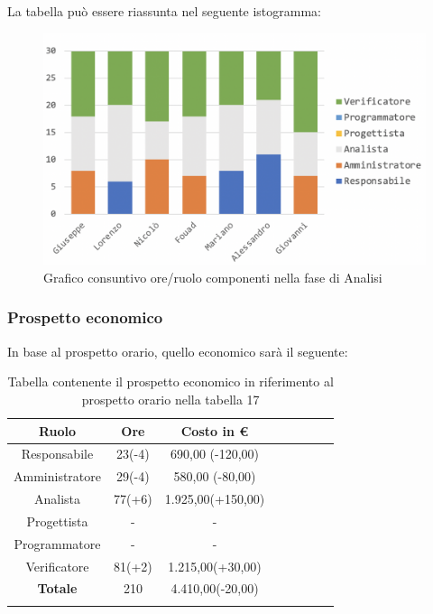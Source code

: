 			La tabella può essere riassunta nel seguente istogramma:
			
			\begin{figure}[H]
				\centering
				\includegraphics[width=0.8\linewidth]{./images/analisiCons1.png}
				\caption{Grafico consuntivo ore/ruolo componenti nella fase di Analisi}
				\label{fig:consuntivo grafico suddivione ruoli fase Analisi}
			\end{figure}
			
		\subsubsection{Prospetto economico}
			In base al prospetto orario, quello economico sarà il seguente: 
			
			\begin{longtable}{|c|c|c|c|c|c|c|c}
				\hline
				\rowcolor{lighter-grayer}
				\textbf{Ruolo} & \textbf{Ore} & \textbf{Costo in €} \\
				\hline
				\endfirsthead
				
				\hline
				Responsabile & 23(-4) & 690,00 (-120,00)\\
				\hline
				\hline
				Amministratore & 29(-4) & 580,00 (-80,00)\\
				\hline
				\hline
				Analista & 77(+6) & 1.925,00(+150,00)\\
				\hline
				\hline
				Progettista & - & -\\
				\hline
				\hline
				Programmatore & - & -\\
				\hline
				\hline
				Verificatore & 81(+2) & 1.215,00(+30,00)\\
				\hline
				\textbf{Totale} & 210 & 4.410,00(-20,00)\\
				\hline
				\caption{Tabella contenente il prospetto economico in riferimento al prospetto orario nella tabella 17}
			\end{longtable}
			\pagebreak
			
